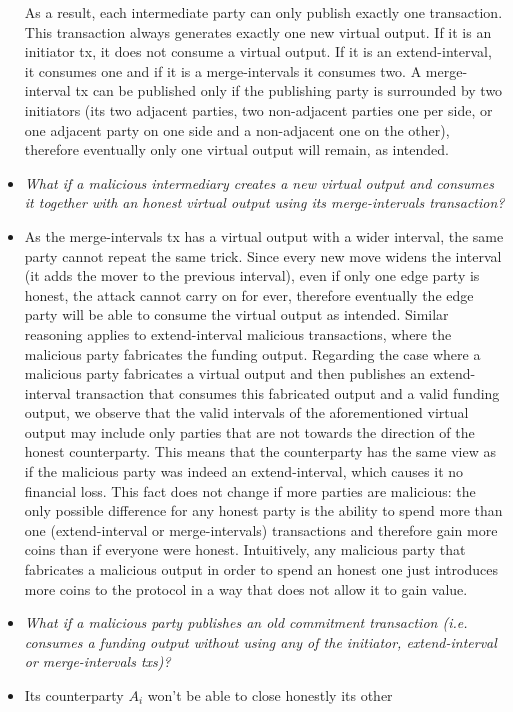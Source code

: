 \begin{itemize}
  As a result, each intermediate party can only publish exactly one transaction.
  This transaction always generates exactly one new virtual output. If it is an
  initiator tx, it does not consume a virtual output. If it is an
  extend-interval, it consumes one and if it is a merge-intervals it consumes
  two. A merge-interval tx can be published only if the publishing party is
  surrounded by two initiators (its two adjacent parties, two non-adjacent
  parties one per side, or one adjacent party on one side and a non-adjacent one
  on the other), therefore eventually only one virtual output will remain, as
  intended.
  \item \emph{What if a malicious intermediary creates a new virtual output and
  consumes it together with an honest virtual output using its merge-intervals
  transaction?}
  \item As the merge-intervals tx has a virtual output with a wider interval,
  the same party cannot repeat the same trick. Since every new move widens the
  interval (it adds the mover to the previous interval), even if only one edge
  party is honest, the attack cannot carry on for ever, therefore eventually the
  edge party will be able to consume the virtual output as intended. Similar
  reasoning applies to extend-interval malicious transactions, where the
  malicious party fabricates the funding output. Regarding the case where a
  malicious party fabricates a virtual output and then publishes an
  extend-interval transaction that consumes this fabricated output and a valid
  funding output, we observe that the valid intervals of the aforementioned
  virtual output may include only parties that are not towards the direction of
  the honest counterparty. This means that the counterparty has the same view as
  if the malicious party was indeed an extend-interval, which causes it no
  financial loss. This fact does not change if more parties are malicious: the
  only possible difference for any honest party is the ability to spend more
  than one (extend-interval or merge-intervals) transactions and therefore gain
  more coins than if everyone were honest. Intuitively, any malicious party that
  fabricates a malicious output in order to spend an honest one just introduces
  more coins to the protocol in a way that does not allow it to gain value.
  \item \emph{What if a malicious party publishes an old commitment transaction
  (i.e. consumes a funding output without using any of the initiator,
  extend-interval or merge-intervals txs)?}
  \item Its counterparty $A_i$ won't be able to close honestly its other

\end{itemize}

